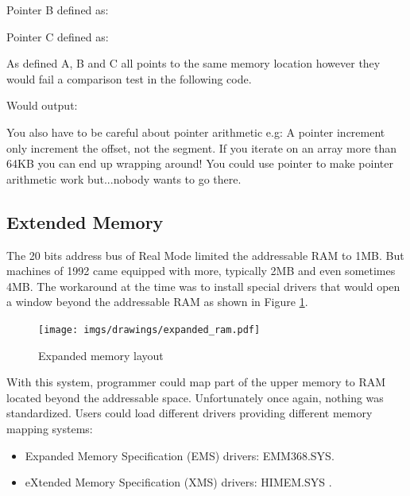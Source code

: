 \documentclass[book.tex]{subfiles}
\begin{document}
\bigskip

Pointer B defined as:\\
\par
\begin{minipage}{\textwidth}

\end{minipage}

\bigskip

Pointer C defined as:\\
\par
\begin{minipage}{\textwidth}

\end{minipage}

As defined A, B and C all points to the same memory location however they would fail a comparison test in the following code.\\

\begin{minipage}{\textwidth}

\end{minipage}
Would output:\\

\begin{minipage}{\textwidth}

\end{minipage}
\par

You also have to be careful about pointer arithmetic e.g: A  pointer increment only increment the offset, not the segment. If you iterate on an array more than 64KB you can end up wrapping around! You could use  pointer to make pointer arithmetic work but...nobody wants to go there.




  \subsection{Extended Memory}

The 20 bits address bus of Real Mode limited the addressable RAM to 1MB. But machines of 1992 came equipped with more, typically 2MB and even sometimes 4MB. The workaround at the time was to install special drivers that would open a window beyond the addressable RAM as shown in Figure \ref{fig:ems_xms_layout}.

\begin{figure}[H]
\centering
\texttt{[image: imgs/drawings/expanded\_ram.pdf]}
\caption{Expanded memory layout}
\label{fig:ems_xms_layout}
\end{figure}
With this system, programmer could map part of the upper memory to RAM located beyond the addressable space.
Unfortunately once again, nothing was standardized. Users could load different drivers providing different memory mapping systems:
\begin{itemize}
\item Expanded Memory Specification (EMS) drivers: EMM368.SYS.
\item eXtended Memory Specification (XMS) drivers: HIMEM.SYS .
\end{itemize}
\end{document}
